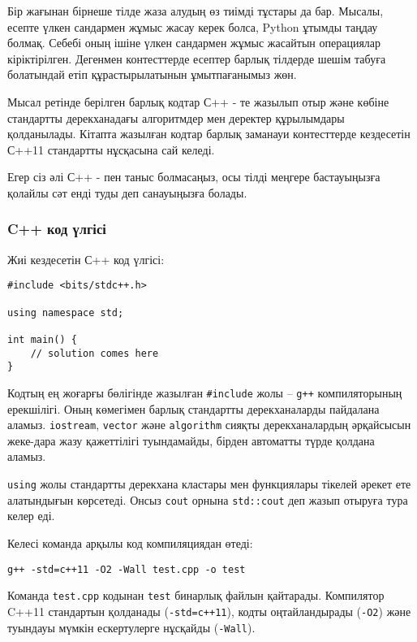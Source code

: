 Бір жағынан бірнеше тілде жаза алудың өз 
тиімді тұстары да бар. 
Мысалы, есепте үлкен сандармен жұмыс жасау керек болса,
Python ұтымды таңдау болмақ. Себебі оның ішіне үлкен сандармен жұмыс жасайтын
операциялар кіріктірілген.
Дегенмен контесттерде есептер барлық тілдерде шешім табуға болатындай етіп
құрастырылатынын ұмытпағанымыз жөн.

Мысал ретінде берілген барлық кодтар С++ - те жазылып отыр және көбіне стандартты дерекханадағы алгоритмдер мен деректер құрылымдары қолданылады.
Кітапта жазылған кодтар барлық заманауи контесттерде кездесетін  С++11 стандартты нұсқасына сай келеді.

Егер сіз әлі С++ - пен таныс болмасаңыз, осы тілді меңгере бастауыңызға қолайлы сәт енді туды деп санауыңызға болады.

\subsubsection{C++ код үлгісі}

Жиі кездесетін С++ код үлгісі:

\begin{lstlisting}
#include <bits/stdc++.h>

using namespace std;

int main() {
    // solution comes here
}
\end{lstlisting}

Кодтың ең жоғарғы бөлігінде жазылған \texttt{\#include} 
жолы -- \texttt{g++} компиляторының ерекшілігі.
Оның көмегімен барлық стандартты дерекханаларды пайдалана аламыз.
\texttt{iostream}, \texttt{vector} және \texttt{algorithm}
сияқты дерекханалардың әрқайсысын жеке-дара жазу қажеттілігі туындамайды,
бірден автоматты түрде қолдана аламыз.

\texttt{using} жолы стандартты дерекхана кластары
мен функциялары тікелей әрекет ете алатындығын көрсетеді.  
Онсыз \texttt{cout} орнына \texttt{std::cout} 
деп жазып отыруға тура келер еді.

Келесі команда арқылы код компиляциядан өтеді:

\begin{lstlisting}
g++ -std=c++11 -O2 -Wall test.cpp -o test
\end{lstlisting}

Команда \texttt{test.cpp} кодынан
\texttt{test} бинарлық файлын қайтарады.
Компилятор C++11 стандартын қолданады
(\texttt{-std=c++11}),
кодты оңтайландырады (\texttt{-O2})
және туындауы мүмкін ескертулерге нұсқайды (\texttt{-Wall}).

